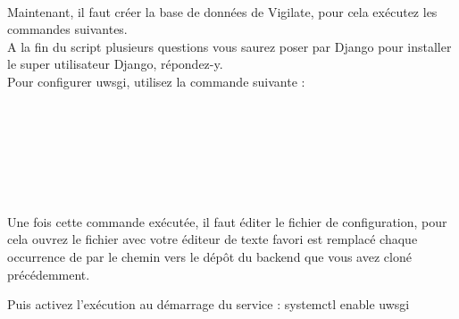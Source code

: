 \\
Maintenant, il faut créer la base de données de Vigilate, pour cela exécutez les commandes suivantes.
\\
A la fin du script plusieurs questions vous saurez poser par Django pour installer le super utilisateur Django, répondez-y.
\\
Pour configurer uwsgi, utilisez la commande suivante :
\\
\\
\\
\\
\\
\\
\\
\\
Une fois cette commande exécutée, il faut éditer le fichier de configuration, pour cela ouvrez le fichier  avec votre éditeur de texte favori est remplacé chaque occurrence de  par le chemin vers le dépôt du backend que vous avez cloné précédemment.

Puis activez l’exécution au démarrage du service :
systemctl enable uwsgi

